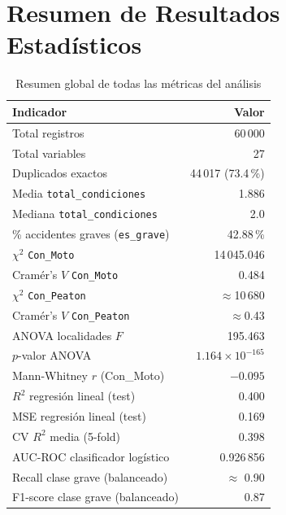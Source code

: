 \documentclass[11pt,a4paper]{article}
\begin{document}
\section{Resumen de Resultados Estadísticos}
\label{app:resumen}

\begin{table}[H]
\centering
\caption{Resumen global de todas las métricas del análisis}
\label{tab:resumen-global}
\begin{tabular}{@{}p{6cm}r@{}}
\toprule
Indicador & Valor \\
\midrule
Total registros & 60\,000 \\
Total variables & 27 \\
Duplicados exactos & 44\,017 (73.4\,\%) \\
Media \texttt{total\_condiciones} & 1.886 \\
Mediana \texttt{total\_condiciones} & 2.0 \\
\% accidentes graves (\texttt{es\_grave}) & 42.88\,\% \\
$\chi^2$ \texttt{Con\_Moto} & 14\,045.046 \\
Cramér's $V$ \texttt{Con\_Moto} & 0.484 \\
$\chi^2$ \texttt{Con\_Peaton} & $\approx$10\,680 \\
Cramér's $V$ \texttt{Con\_Peaton} & $\approx$0.43 \\
ANOVA localidades $F$ & 195.463 \\
$p$-valor ANOVA & $1.164 \times 10^{-165}$ \\
Mann-Whitney $r$ (Con\_Moto) & $-0.095$ \\
$R^2$ regresión lineal (test) & 0.400 \\
MSE regresión lineal (test) & 0.169 \\
CV $R^2$ media (5-fold) & 0.398 \\
AUC-ROC clasificador logístico & 0.926\,856 \\
Recall clase grave (balanceado) & $\approx$ 0.90 \\
F1-score clase grave (balanceado) & 0.87 \\
\bottomrule
\end{tabular}
\end{table}
\end{document}
